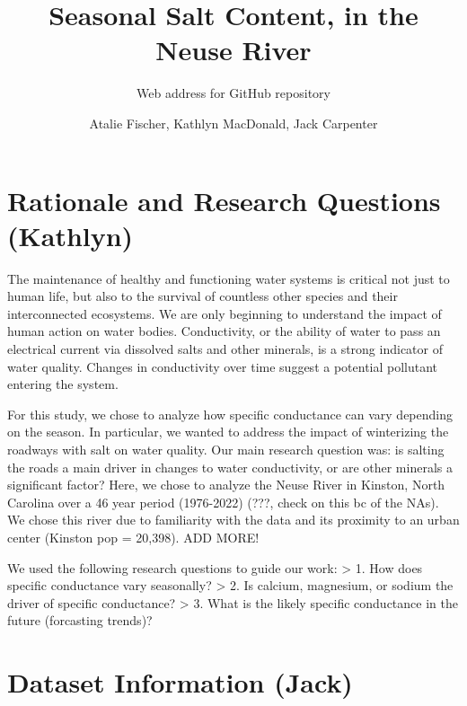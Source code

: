 \documentclass[
  12pt,
]{article}
\title{Seasonal Salt Content, in the Neuse River}
\subtitle{Web address for GitHub repository}
\author{Atalie Fischer, Kathlyn MacDonald, Jack Carpenter}
\date{}
\begin{document}
\maketitle

{
\setcounter{tocdepth}{2}
\tableofcontents
}
\newpage
\tableofcontents 
\newpage
\listoftables 
\newpage
\listoffigures 
\newpage

\hypertarget{rationale-and-research-questions-kathlyn}{%
\section{Rationale and Research Questions
(Kathlyn)}\label{rationale-and-research-questions-kathlyn}}

The maintenance of healthy and functioning water systems is critical not
just to human life, but also to the survival of countless other species
and their interconnected ecosystems. We are only beginning to understand
the impact of human action on water bodies. Conductivity, or the ability
of water to pass an electrical current via dissolved salts and other
minerals, is a strong indicator of water quality. Changes in
conductivity over time suggest a potential pollutant entering the
system.

For this study, we chose to analyze how specific conductance can vary
depending on the season. In particular, we wanted to address the impact
of winterizing the roadways with salt on water quality. Our main
research question was: is salting the roads a main driver in changes to
water conductivity, or are other minerals a significant factor? Here, we
chose to analyze the Neuse River in Kinston, North Carolina over a 46
year period (1976-2022) (???, check on this bc of the NAs). We chose
this river due to familiarity with the data and its proximity to an
urban center (Kinston pop = 20,398). ADD MORE!

We used the following research questions to guide our work:
\textgreater{} 1. How does specific conductance vary seasonally?
\textgreater{} 2. Is calcium, magnesium, or sodium the driver of
specific conductance? \textgreater{} 3. What is the likely specific
conductance in the future (forcasting trends)?

\newpage

\hypertarget{dataset-information-jack}{%
\section{Dataset Information (Jack)}\label{dataset-information-jack}}
\end{document}
